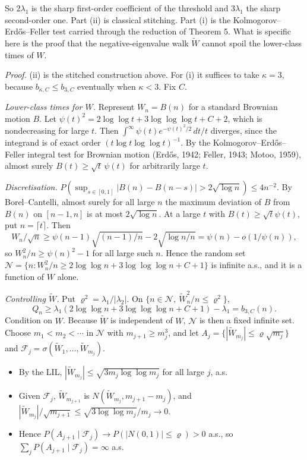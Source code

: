 \documentclass[
  10pt,
  a4paper,
]{article}
\providecommand{\tightlist}{%
  \setlength{\itemsep}{0pt}\setlength{\parskip}{0pt}}
\begin{document}
So \(2\lambda_1\) is the sharp first-order coefficient of the threshold
and \(3\lambda_1\) the sharp second-order one. Part (ii) is classical
stitching. Part (i) is the Kolmogorov--Erdős--Feller test carried
through the reduction of Theorem 5. What is specific here is the proof
that the negative-eigenvalue walk \(\widetilde W\) cannot spoil the
lower-class times of \(W\).

\emph{Proof.} (ii) is the stitched construction above. For (i) it
suffices to take \(\kappa=3\), because \(b_{\kappa,C}\le b_{3,C}\)
eventually when \(\kappa<3\). Fix \(C\).

\emph{Lower-class times for \(W\).} Represent \(W_n=B(n)\) for a
standard Brownian motion \(B\). Let
\(\psi(t)^2=2\log\log t+3\log\log\log t+C+2\), which is nondecreasing
for large \(t\). Then \(\int^\infty\psi(t)e^{-\psi(t)^2/2}\,dt/t\)
diverges, since the integrand is of exact order
\((t\log t\log\log t)^{-1}\). By the Kolmogorov--Erdős--Feller integral
test for Brownian motion (Erdős, 1942; Feller, 1943; Motoo, 1959),
almost surely \(B(t)\ge\sqrt t\,\psi(t)\) for arbitrarily large \(t\).

\emph{Discretisation.}
\(P(\sup_{s\in[0,1]}|B(n)-B(n-s)|>2\sqrt{\log n})\le4n^{-2}\). By
Borel--Cantelli, almost surely for all large \(n\) the maximum deviation
of \(B\) from \(B(n)\) on \([n-1,n]\) is at most \(2\sqrt{\log n}\). At
a large \(t\) with \(B(t)\ge\sqrt t\psi(t)\), put \(n=\lceil t\rceil\).
Then
\[W_n/\sqrt n\ge\psi(n-1)\sqrt{(n-1)/n}-2\sqrt{\log n/n}=\psi(n)-o(1/\psi(n)),\]
so \(W_n^2/n\ge\psi(n)^2-1\) for all large such \(n\). Hence the random
set \(\mathcal N=\{n:W_n^2/n\ge2\log\log n+3\log\log\log n+C+1\}\) is
infinite a.s., and it is a function of \(W\) alone.

\emph{Controlling \(\widetilde W\).} Put
\(\varrho^2=\lambda_1/|\lambda_2|\). On
\(\{n\in\mathcal N,\ \widetilde W_n^2/n\le\varrho^2\}\),
\[Q_n\ge\lambda_1(2\log\log n+3\log\log\log n+C+1)-\lambda_1=b_{3,C}(n).\]
Condition on \(W\). Because \(\widetilde W\) is independent of \(W\),
\(\mathcal N\) is then a fixed infinite set. Choose \(m_1<m_2<\cdots\)
in \(\mathcal N\) with \(m_{j+1}\ge m_j^3\), and let
\(A_j=\{|\widetilde W_{m_j}|\le\varrho\sqrt{m_j}\}\) and
\(\mathcal F_j=\sigma(\widetilde W_1,\dots,\widetilde W_{m_j})\).

\begin{itemize}
\tightlist
\item
  By the LIL, \(|\widetilde W_{m_j}|\le\sqrt{3m_j\log\log m_j}\) for all
  large \(j\), a.s.
\item
  Given \(\mathcal F_j\), \(\widetilde W_{m_{j+1}}\) is
  \(N(\widetilde W_{m_j},m_{j+1}-m_j)\), and
  \(|\widetilde W_{m_j}|/\sqrt{m_{j+1}}\le\sqrt{3\log\log m_j}/m_j\to0\).
\item
  Hence \(P(A_{j+1}\mid\mathcal F_j)\to P(|N(0,1)|\le\varrho)>0\) a.s.,
  so \(\sum_jP(A_{j+1}\mid\mathcal F_j)=\infty\) a.s.
\end{itemize}
\end{document}
